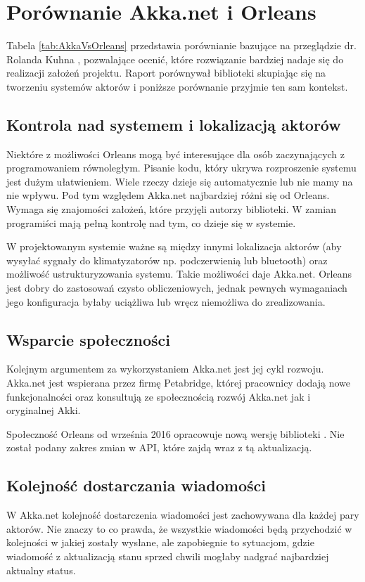 \section{Porównanie Akka.net i Orleans}
Tabela \ref{tab:AkkaVsOrleans} przedstawia porównianie bazujące na przeglądzie dr. Rolanda Kuhna \cite{bib:AkkaVsOrleans}, pozwalające ocenić, które rozwiązanie bardziej nadaje się do realizacji założeń projektu. Raport porównywał biblioteki skupiając się na tworzeniu systemów aktorów i poniższe porównanie przyjmie ten sam kontekst.

\subsection*{Kontrola nad systemem i lokalizacją aktorów}
Niektóre z możliwości Orleans mogą być interesujące dla osób zaczynających z programowaniem równoległym. 
Pisanie kodu, który ukrywa rozproszenie systemu jest dużym ułatwieniem. 
Wiele rzeczy dzieje się automatycznie lub nie mamy na nie wpływu. 
Pod tym względem Akka.net najbardziej różni się od Orleans. Wymaga się znajomości założeń, które przyjęli autorzy biblioteki. W zamian programiści mają pełną kontrolę nad tym, co dzieje się w systemie.

W projektowanym systemie ważne są między innymi lokalizacja aktorów (aby wysyłać sygnały do klimatyzatorów np. podczerwienią lub bluetooth) oraz możliwość ustrukturyzowania systemu. 
Takie możliwości daje Akka.net. Orleans jest dobry do zastosowań czysto obliczeniowych, jednak pewnych wymaganiach jego konfiguracja byłaby uciążliwa lub wręcz niemożliwa do zrealizowania.

\subsection*{Wsparcie społeczności}
Kolejnym argumentem za wykorzystaniem Akka.net jest jej cykl rozwoju.
Akka.net jest wspierana przez firmę Petabridge, której pracownicy dodają nowe funkcjonalności oraz konsultują ze społecznością rozwój Akka.net jak i oryginalnej Akki. 

Społeczność Orleans od września 2016 opracowuje nową wersję biblioteki \cite{bib:Orleans2}. Nie został podany zakres zmian w API, które zajdą wraz z tą aktualizacją. 

\subsection*{Kolejność dostarczania wiadomości}
W Akka.net kolejność dostarczenia wiadomości jest zachowywana dla każdej pary aktorów. Nie znaczy to co prawda, że wszystkie wiadomości będą przychodzić w kolejności w jakiej zostały wysłane, ale zapobiegnie to sytuacjom, gdzie wiadomość z aktualizacją stanu sprzed chwili mogłaby nadgrać najbardziej aktualny status.


